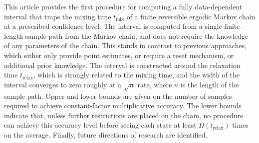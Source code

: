 This article provides the first procedure for computing a fully
data-dependent interval that traps the mixing time
$t_{\text{mix}}$ of a finite
reversible ergodic Markov chain at a prescribed confidence level.  The
interval is computed from a single finite-length sample path from the
Markov chain, and does not require the knowledge of any parameters of
the chain.  This stands in contrast to previous approaches, which
either only provide point estimates, or require a reset mechanism, or
additional prior knowledge.
The interval is constructed around the relaxation time
$t_{\text{relax}}$, which is strongly related to the mixing time, and
the width of the interval converges to zero roughly
at a $\sqrt{n}$ rate, where $n$ is the length of the sample path.
Upper and lower bounds are given on the number of samples required to
achieve constant-factor multiplicative accuracy.  The lower bounds
indicate that, unless further restrictions are placed on the chain, no
procedure can achieve this accuracy level before seeing each state at
least $\Omega(t_{\text{relax}})$ times on the average.  Finally, future
directions of research are identified.

